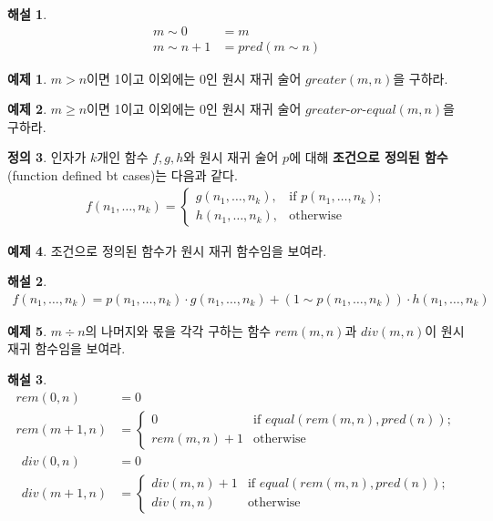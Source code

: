 \documentclass[b5paper, 11pt]{book}
\theoremstyle{definition}
\newtheorem{defn}{정의}[chapter]
\newtheorem{ex}[defn]{예제}
\newtheorem*{ans*}{해설}
\begin{document}
\begin{ans*}
    \begin{align*}
        m \sim 0 &= m \\ 
        m \sim n+1 &= pred(m \sim n) 
    \end{align*}
\end{ans*}
\begin{ex}
    $m > n$이면 1이고 이외에는 0인 원시 재귀 술어 $greater(m,n)$을 구하라. 
\end{ex}
\begin{ex}
    $m \ge n$이면 1이고 이외에는 0인 원시 재귀 술어 $greater\text{-}or\text{-}equal(m,n)$을 구하라.
\end{ex}
\begin{defn}
    인자가 $k$개인 함수 $f, g, h$와 원시 재귀 술어 $p$에 대해 
    \textbf{조건으로 정의된 함수}(function defined bt cases)는 다음과 같다.
    \begin{align*}
        f(n_1, \ldots, n_k) = 
        \begin{cases}
            g(n_1, \ldots , n_k), & \text{if } p(n_1, \ldots, n_k); \\
            h(n_1, \ldots, n_k),  & \text{otherwise}
        \end{cases}
    \end{align*}
\end{defn}
\begin{ex}
    조건으로 정의된 함수가 원시 재귀 함수임을 보여라.
\end{ex}
\begin{ans*}
    \begin{align*}
        f(n_1, \ldots, n_k) = p(n_1, \ldots, n_k) \cdot g(n_1, \ldots, n_k) + (1\sim p(n_1, \ldots, n_k)) \cdot h(n_1, \ldots, n_k)
    \end{align*}
\end{ans*}
\begin{ex}
    $m \div n$의 나머지와 몫을 각각 구하는 함수 $rem(m,n)$과 $div(m,n)$이 원시 재귀 함수임을 보여라.  
\end{ex}
\begin{ans*}
    \begin{align*}
        rem(0,n) &= 0 \\
        rem(m+1, n) &= 
        \begin{cases}
            0 & \text{if } equal(rem(m,n), pred(n)); \\ 
            rem(m,n) + 1 & \text{otherwise}
        \end{cases} 
    \end{align*}
    \begin{align*}
        div(0,n) &= 0 \\
        div(m+1, n) &= 
        \begin{cases}
            div(m, n) + 1 & \text{if } equal(rem(m,n), pred(n)); \\ 
            div(m,n) & \text{otherwise}
        \end{cases} 
    \end{align*}
\end{ans*}
\end{document}
